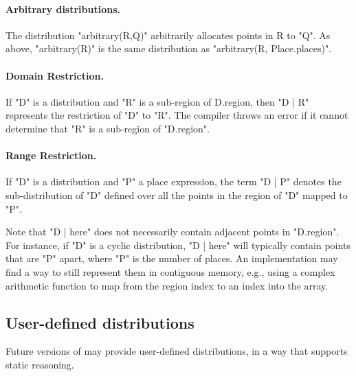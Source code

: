 \paragraph{Arbitrary distributions.} 
The distribution \xcd"arbitrary(R,Q)" arbitrarily allocates points in {\cf
R} to \xcd"Q". As above, \xcd"arbitrary(R)" is the same distribution as
\xcd"arbitrary(R, Place.places)".


\paragraph{Domain Restriction.} 

If \xcd"D" is a distribution and \xcd"R" is a sub-region of {\cf
D.region}, then \xcd"D | R" represents the restriction of \xcd"D" to
\xcd"R".  The compiler throws an error if it cannot determine that
\xcd"R" is a sub-region of \xcd"D.region".

\paragraph{Range Restriction.}

If \xcd"D" is a distribution and \xcd"P" a place expression, the term
\xcd"D | P" denotes the sub-distribution of \xcd"D" defined over all the
points in the region of \xcd"D" mapped to \xcd"P".

Note that \xcd"D | here" does not necessarily contain adjacent points
in \xcd"D.region". For instance, if \xcd"D" is a cyclic distribution,
\xcd"D | here" will typically contain points that are \xcd"P" apart,
where \xcd"P" is the number of places. An implementation may find a
way to still represent them in contiguous memory, e.g., using a
complex arithmetic function to map from the region index to an index
into the array.

\subsection{User-defined distributions}

Future versions of \Xten{} may provide user-defined distributions, in
a way that supports static reasoning.


